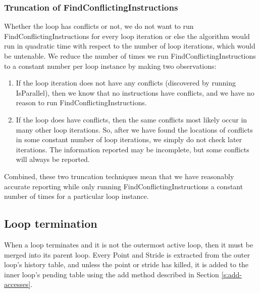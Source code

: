 \documentclass[12pt,twoside]{reedthesis}
\begin{document}
			
		
		\subsubsection{Truncation of FindConflictingInstructions}
			
			Whether the loop has conflicts or not, we do not want to run FindConflictingInstructions for every loop iteration or else the algorithm would run in quadratic time with respect to the number of loop iterations, which would be untenable. We reduce the number of times we run FindConflictingInstructions to a constant number per loop instance by making two observations: 
			
			\begin{enumerate}
				\item If the loop iteration does not have any conflicts (discovered by running IsParallel), then we know that no instructions have conflicts, and we have no reason to run FindConflictingInstructions. 
				\item If the loop does have conflicts, then the same conflicts most likely occur in many other loop iterations. So, after we have found the locations of conflicts in some constant number of loop iterations, we simply do not check later iterations. The information reported may be incomplete, but some conflicts will always be reported.%
			\end{enumerate}

			

			
			Combined, these two truncation techniques mean that we have reasonably accurate reporting while only running FindConflictingInstructions a constant number of times for a particular loop instance.
			
			
	\subsection{Loop termination}
		
			When a loop terminates and it is not the outermost active loop, then it must be merged into its parent loop. Every Point and Stride is extracted from the outer loop's history table, and unless the point or stride has killed, it is added to the inner loop's pending table using the add method described in Section \ref{s:add-accesses}. 
		
\end{document}
